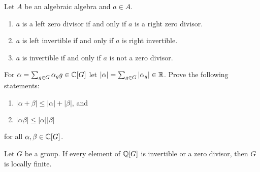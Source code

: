 
\begin{exercise}
\label{xca:invertible_algebraic}
	Let $A$ be an algebraic algebra and $a\in A$.
	\begin{enumerate}
		\item $a$ is a left zero divisor if and only if $a$ is a right zero divisor.
		\item $a$ is left invertible if and only if $a$ is right invertible.
		\item $a$ is invertible if and only if $a$ is not a zero divisor.
	\end{enumerate}
\end{exercise}

\begin{exercise}
	\label{exa:norma}
	For $\alpha=\sum_{g\in G}\alpha_gg\in\mathbb{C}[G]$ let $|\alpha|=\sum_{g\in
	G}|\alpha_g|\in\mathbb{R}$. Prove the following statements:
	\begin{enumerate}
		\item $|\alpha+\beta|\leq|\alpha|+|\beta|$, and 
		\item $|\alpha\beta|\leq|\alpha||\beta|$ 
	\end{enumerate}
	for all $\alpha,\beta\in\mathbb{C}[G]$.
\end{exercise}

\begin{theorem}[Formanek]
	\label{thm:FormanekQ}
	Let $G$ be a group. If every element of $\mathbb{Q}[G]$ is invertible or 
	a zero divisor, then $G$ is locally finite. 
\end{theorem}

